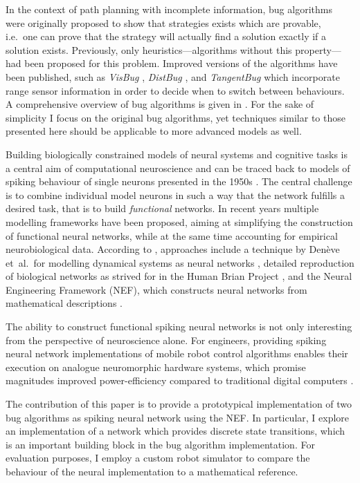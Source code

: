 \documentclass[letterpaper,10pt,conference]{ieeeconf}
\begin{document}
In the context of path planning with incomplete information, bug algorithms were originally proposed to show that strategies exists which are provable, i.e.~one can prove that the strategy will actually find a solution exactly if a solution exists. Previously, only heuristics---algorithms without this property---had been proposed for this problem. Improved versions of the algorithms have been published, such as \emph{VisBug} \cite{lumelsky1990incorporating}, \emph{DistBug} \cite{kamon1997sensorybased}, and \emph{TangentBug} \cite{kamon1998tangentbug} which incorporate range sensor information in order to decide when to switch between behaviours. A comprehensive overview of bug algorithms is given in \cite{lavalle2006planning}. For the sake of simplicity I focus on the original bug algorithms, yet techniques similar to those presented here should be applicable to more advanced models as well.

Building biologically constrained models of neural systems and cognitive tasks is a central aim of computational neuroscience and can be traced back to models of spiking behaviour of single neurons presented in the 1950s \cite{hodgkin1952quantitative}. The central challenge is to combine individual model neurons in such a way that the network fulfills a desired task, that is to build \emph{functional} networks. In recent years multiple modelling frameworks have been proposed, aiming at simplifying the construction of functional neural networks, while at the same time accounting for empirical neurobiological data. According to \cite{komer2016unified}, approaches include a technique by Denève et~al.~for modelling dynamical systems as neural networks \cite{martin2013predictive}, detailed reproduction of biological networks as strived for in the Human Brian Project \cite{markram2012human}, and the Neural Engineering Framework (NEF), which constructs neural networks from mathematical descriptions \cite{eliasmith2003neural}.

The ability to construct functional spiking neural networks is not only interesting from the perspective of neuroscience alone. For engineers, providing spiking neural network implementations of mobile robot control algorithms enables their execution on analogue neuromorphic hardware systems, which promise magnitudes improved power-efficiency compared to traditional digital computers \cite{boahen2017neuromorph}.

The contribution of this paper is to provide a prototypical implementation of two bug algorithms as spiking neural network using the NEF. In particular, I explore an implementation of a network which provides discrete state transitions, which is an important building block in the bug algorithm implementation. For evaluation purposes, I employ a custom robot simulator to compare the behaviour of the neural implementation to a mathematical reference.
\end{document}
